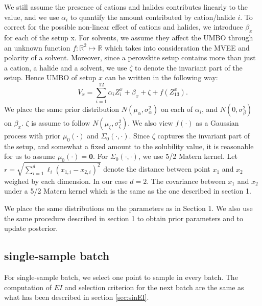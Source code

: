 \documentclass[11pt]{article}
\begin{document}
We still assume the presence of cations and halides contributes linearly to the value, and we use $\alpha_i$ to quantify the amount contributed by cation/halide $i$. To correct for the possible non-linear effect of cations and halides, we introduce $\beta_x$ for each of the setup x. For solvents, we assume they affect the UMBO through an unknown function $f:\mathbb{R}^{2}\mapsto \mathbb{R}$ which takes into consideration the MVEE and polarity of a solvent. Moreover, since a perovskite setup contains more than just a cation, a halide and a solvent, we use $\zeta$ to denote the invariant part of the setup. Hence UMBO of setup $x$ can be written in the following way:
\begin{equation}
V_x = \sum_{i=1}^{12}\alpha_i Z_i^x + \beta_x + \zeta + f(Z_{13}^x).
\end{equation}
We place the same prior distribution $N(\mu_{\alpha},\sigma^2_{\alpha})$ on each of $\alpha_i$, and $N(0, \sigma^2_{\beta})$ on $\beta_x$. $\zeta$ is assume to follow $N(\mu_{\zeta}, \sigma^2_{\zeta})$. We also view $f(\cdot)$ as a Gaussian process with prior $\mu_0(\cdot)$ and $\Sigma_0(\cdot,\cdot)$. Since $\zeta$ captures the invariant part of the setup, and somewhat a fixed amount to the solubility value, it is reasonable for us to assume $\mu_0(\cdot)=\mathbf{0}$. For $\Sigma_0(\cdot,\cdot)$, we use 5/2 Matern kernel. Let $r = \sqrt{\sum_{i=1}^{d}\ell_i(x_{1,i}-x_{2,i})^2}$ denote the distance between point $x_1$ and $x_2$ weighed by each dimension. In our case $d = 2$. The covariance between $x_1$ and $x_2$ under a 5/2 Matern kernel which is the same as the one described in section 1.

We place the same distributions on the parameters as in Section 1. We also use the same procedure described in section 1 to obtain prior parameters and to update posterior.
\subsection{single-sample batch} 
For single-sample batch, we select one point to sample in every batch. The computation of $EI$ and selection criterion for the next batch are the same as what has been described in section \ref{sec:sinEI}.
\end{document}
